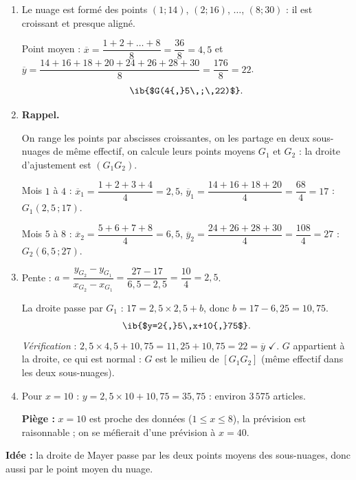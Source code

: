 \begin{enumerate}
  \item Le nuage est formé des points $(1;14)$, $(2;16)$, $\dots$, $(8;30)$ : il est croissant et presque aligné.

  Point moyen : $\overline{x}=\dfrac{1+2+\dots+8}8=\dfrac{36}8=4{,}5$ et $\overline{y}=\dfrac{14+16+18+20+24+26+28+30}8=\dfrac{176}8=22$.
  $$ \ib{$G(4{,}5\,;\,22)$}.$$
  \item \textbf{Rappel.}\par
  \begin{prop}
  On range les points par abscisses croissantes, on les partage en deux sous-nuages de même effectif, on calcule leurs points moyens $G_1$ et $G_2$ : la droite d'ajustement est $(G_1G_2)$.
  \end{prop}
  Mois $1$ à $4$ : $\overline{x}_1=\dfrac{1+2+3+4}4=2{,}5$, $\overline{y}_1=\dfrac{14+16+18+20}4=\dfrac{68}4=17$ : $G_1(2{,}5\,;17)$.

  Mois $5$ à $8$ : $\overline{x}_2=\dfrac{5+6+7+8}4=6{,}5$, $\overline{y}_2=\dfrac{24+26+28+30}4=\dfrac{108}4=27$ : $G_2(6{,}5\,;27)$.
  \item Pente : $a=\dfrac{y_{G_2}-y_{G_1}}{x_{G_2}-x_{G_1}}=\dfrac{27-17}{6{,}5-2{,}5}=\dfrac{10}4=2{,}5$.

  La droite passe par $G_1$ : $17=2{,}5\times2{,}5+b$, donc $b=17-6{,}25=10{,}75$.
  $$ \ib{$y=2{,}5\,x+10{,}75$}.$$
  \emph{Vérification} : $2{,}5\times4{,}5+10{,}75=11{,}25+10{,}75=22=\overline{y}$ $\checkmark$. $G$ appartient à la droite, ce qui est normal : $G$ est le milieu de $[G_1G_2]$ (même effectif dans les deux sous-nuages).
  \item Pour $x=10$ : $y=2{,}5\times10+10{,}75=35{,}75$ : environ $3\,575$ articles.

  \textbf{Piège :} $x=10$ est proche des données ($1\le x\le8$), la prévision est raisonnable ; on se méfierait d'une prévision à $x=40$.
\end{enumerate}

\textbf{Idée :} la droite de Mayer passe par les deux points moyens des sous-nuages, donc aussi par le point moyen du nuage.
